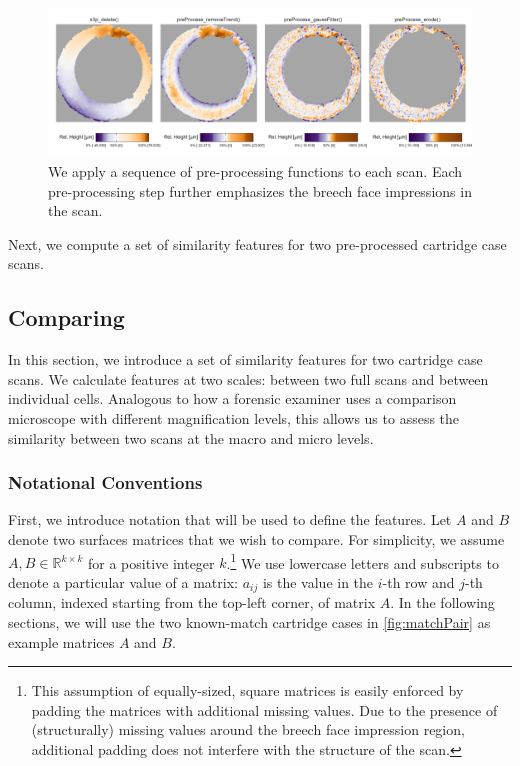 \documentclass[preprint]{JASA}
\begin{document}
\begin{figure}[htbp]
\includegraphics[width=\textwidth]{figures/preProcessEffect} \caption{\label{fig:preProcessEffect} We apply a sequence of pre-processing functions to each scan. Each pre-processing step further emphasizes the breech face impressions in the scan.}\label{fig:unnamed-chunk-3}
\end{figure}

Next, we compute a set of similarity features for two pre-processed
cartridge case scans.

\hypertarget{comparing}{%
\subsection{Comparing}\label{comparing}}

In this section, we introduce a set of similarity features for two
cartridge case scans. We calculate features at two scales: between two
full scans and between individual cells. Analogous to how a forensic
examiner uses a comparison microscope with different magnification
levels, this allows us to assess the similarity between two scans at the
macro and micro levels.

\hypertarget{notational-conventions}{%
\subsubsection{Notational Conventions}\label{notational-conventions}}

First, we introduce notation that will be used to define the features.
Let \(A\) and \(B\) denote two surfaces matrices that we wish to
compare. For simplicity, we assume \(A,B \in \mathbb{R}^{k \times k}\)
for a positive integer
\(k\).\footnote{This assumption of equally-sized, square matrices is easily enforced by padding the matrices with additional missing values.
Due to the presence of (structurally) missing values around the breech face impression region, additional padding does not interfere with the structure of the scan.}
We use lowercase letters and subscripts to denote a particular value of
a matrix: \(a_{ij}\) is the value in the \(i\)-th row and \(j\)-th
column, indexed starting from the top-left corner, of matrix \(A\). In
the following sections, we will use the two known-match cartridge cases
in \autoref{fig:matchPair} as example matrices \(A\) and \(B\).
\end{document}

